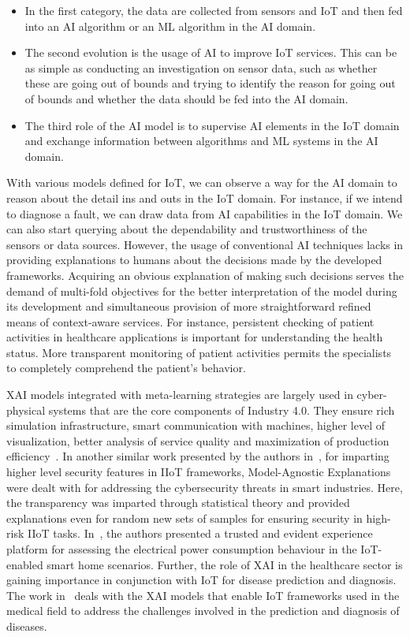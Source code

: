 \documentclass[journal]{IEEEtran}
\begin{document}
\begin{itemize}
    \item In the first category, the data are collected from sensors and IoT and then fed into an AI algorithm or an ML algorithm in the AI domain. 

    \item The second evolution is the usage of AI to improve IoT services. This can be as simple as conducting an investigation on sensor data, such as whether these are going out of bounds and trying to identify the reason for going out of bounds and whether the data should be fed into the AI domain. 

    \item The third role of the AI model is to supervise AI elements in the IoT domain and exchange information between algorithms and ML systems in the AI domain. 
\end{itemize}

With various models defined for IoT, we can observe a way for the AI domain to reason about the detail ins and outs in the IoT domain. For instance, if we intend to diagnose a fault, we can draw data from AI capabilities in the IoT domain. We can also start querying about the dependability and trustworthiness of the sensors or data sources. However, the usage of conventional AI techniques lacks in providing explanations to humans about the decisions made by the developed frameworks. Acquiring an obvious explanation of making such decisions serves the demand of multi-fold objectives for the better interpretation of the model during its development and simultaneous provision of more straightforward refined means of context-aware services. For instance, persistent checking of patient activities in healthcare applications is important for understanding the health status. More transparent monitoring of patient activities permits the specialists to completely comprehend the patient's behavior. 

XAI models integrated with meta-learning strategies are largely used in cyber-physical systems that are the core components of Industry 4.0. They ensure rich simulation infrastructure, smart communication with machines, higher level of visualization, better analysis of service quality and maximization of production efficiency~\cite{zoppi2021meta}. In another similar work presented by the authors in~\cite{zolanvari2021trust}, for imparting higher level security features in IIoT frameworks, Model-Agnostic Explanations were dealt with for addressing the cybersecurity threats in smart industries. Here, the transparency was imparted through statistical theory and provided explanations even for random new sets of samples for ensuring security in high-risk IIoT tasks. In~\cite{zolanvari2021trust}, the authors presented a trusted and evident experience platform for assessing the electrical power consumption behaviour in the IoT-enabled smart home scenarios. Further, the role of XAI in the healthcare sector is gaining importance in conjunction with IoT for disease prediction and diagnosis. The work in~\cite{srinivasu2022blackbox} deals with the XAI models that enable IoT frameworks used in the medical field to address the challenges involved in the prediction and diagnosis of diseases.
\end{document}
